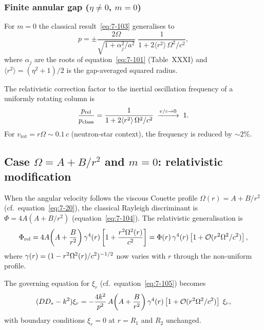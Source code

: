 \subsubsection{Finite annular gap ($\eta \neq 0$, $m=0$)}

For $m = 0$ the classical result~\eqref{eq:7-103} generalises to
\begin{equation}
\label{eq:rel-7-68-disp-annular}
p = \pm\frac{2\Omega}{\sqrt{1+\alpha_j^2/a^2}}
\;\frac{1}{1 + 2\langle r^2\rangle\,\Omega^2/c^2},
\end{equation}
where $\alpha_j$ are the roots of
equation~\eqref{eq:7-101} (Table~XXXI) and
$\langle r^2\rangle = (\eta^2+1)/2$ is the gap-averaged squared radius.

\begin{relcorrection}
The relativistic correction factor to the inertial oscillation
frequency of a uniformly rotating column is
\[
\frac{p_{\mathrm{rel}}}{p_{\mathrm{class}}}
= \frac{1}{1 + 2\langle r^2\rangle\,\Omega^2/c^2}
\;\xrightarrow{v/c \to 0}\; 1.
\]
For $v_{\mathrm{rot}} = r\Omega \sim 0.1\,c$ (neutron-star context),
the frequency is reduced by $\sim 2\%$.
\end{relcorrection}

\subsection{Case $\Omega = A + B/r^2$ and $m=0$: relativistic modification}
\label{sec:rel-7-68-viscous-Omega}

When the angular velocity follows the viscous Couette profile
$\Omega(r) = A + B/r^2$ (cf.\ equation~\eqref{eq:7-20}), the
classical Rayleigh discriminant is $\Phi = 4A(A+B/r^2)$
(equation~\eqref{eq:7-104}).  The relativistic generalisation is
\begin{equation}
\label{eq:rel-7-68-Phi-viscous}
\Phi_{\mathrm{rel}}
= 4A\!\left(A + \frac{B}{r^2}\right)
  \gamma^4(r)
  \left[1 + \frac{r^2\Omega^2(r)}{c^2}\right]
= \Phi(r)\,\gamma^4(r)\left[1 + \mathcal{O}(r^2\Omega^2/c^2)\right],
\end{equation}
where $\gamma(r) = (1 - r^2\Omega^2(r)/c^2)^{-1/2}$ now varies with $r$
through the non-uniform profile.

The governing equation for $\xi_r$ (cf.\ equation~\eqref{eq:7-105}) becomes
\begin{equation}
\label{eq:rel-7-68-105}
(DD_* - k^2)\xi_r
= -\frac{4k^2}{p^2}\,A\!\left(A + \frac{B}{r^2}\right)
  \gamma^4(r)\left[1 + \mathcal{O}(r^2\Omega^2/c^2)\right]\;\xi_r,
\end{equation}
with boundary conditions $\xi_r = 0$ at $r = R_1$ and $R_2$ unchanged.

